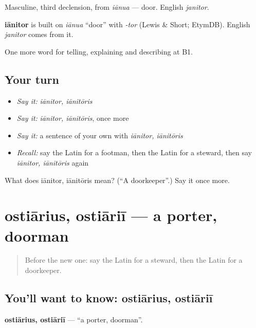 Masculine, third declension, from \emph{iānua} — door. English \emph{janitor}.

\begin{cousinweb}
\textbf{iānitor} is built on \emph{iānua} \textquotedblleft{}door\textquotedblright{} with \emph{-tor} (Lewis \& Short; EtymDB). English \emph{janitor} comes from it.
\end{cousinweb}

\begin{grammarlens}[title={What you've built}]
One more word for telling, explaining and describing at B1.
\end{grammarlens}

\subsection*{Your turn}
\begin{itemize}
\raggedright
  \item \emph{Say it:} \emph{iānitor, iānitōris}
  \item \emph{Say it:} \emph{iānitor, iānitōris}, once more
  \item \emph{Say it:} a sentence of your own with \emph{iānitor, iānitōris}
  \item \emph{Recall:} say the Latin for a footman, then the Latin for a steward, then say \emph{iānitor, iānitōris} again
\end{itemize}

\begin{tcolorbox}[breakable,colback=teal!4,colframe=teal!35!black,title={Before you move on}]
What does iānitor, iānitōris mean? (\textquotedblleft{}A doorkeeper\textquotedblright{}.) Say it once more.
\end{tcolorbox}
\section[ostiārius, ostiāriī]{ostiārius, ostiāriī — a porter, doorman}

\label{lesson:LA-C531-ostiarius}



\begin{quote}
Before the new one: say the Latin for a steward, then the Latin for a doorkeeper.
\end{quote}

\subsection*{You'll want to know: ostiārius, ostiāriī}
\textbf{ostiārius, ostiāriī} — \textquotedblleft{}a porter, doorman\textquotedblright{}.

